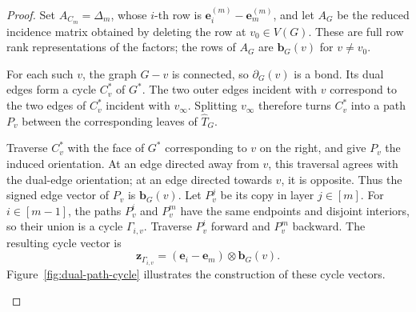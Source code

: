 \documentclass[10pt,a4paper]{amsart}
\numberwithin{equation}{section}
\theoremstyle{definition}
\theoremstyle{remark}
\begin{document}
\begin{proof}
Set \(A_{C_m}=\Delta_m\), whose \(i\)-th row is
\(\boldsymbol e_i^{(m)}-\boldsymbol e_m^{(m)}\), and let \(A_G\)
be the reduced incidence matrix obtained by deleting the row at
\(v_0\in V(G)\).  These are full row rank representations of the
factors; the rows of \(A_G\) are
\(\boldsymbol b_G(v)\) for \(v\ne v_0\).

For each such \(v\), the graph \(G-v\) is connected, so
\(\partial_G(v)\) is a bond.  Its dual edges form a cycle
\(C_v^*\) of \(G^*\).  The two outer edges incident with \(v\)
correspond to the two edges of \(C_v^*\) incident with
\(v_\infty\).  Splitting \(v_\infty\) therefore turns \(C_v^*\)
into a path \(P_v\) between the corresponding leaves of
\(\widehat T_G\).

Traverse \(C_v^*\) with the face of \(G^*\) corresponding to
\(v\) on the right, and give \(P_v\) the induced orientation.
At an edge directed away from \(v\), this traversal agrees with
the dual-edge orientation; at an edge directed towards \(v\),
it is opposite.  Thus the signed edge vector of \(P_v\) is
\(\boldsymbol b_G(v)\).  Let \(P_v^j\) be its copy in layer
\(j\in[m]\).  For \(i\in[m-1]\), the paths \(P_v^i\) and
\(P_v^m\) have the same endpoints and disjoint interiors, so
their union is a cycle \(\Gamma_{i,v}\).  Traverse \(P_v^i\)
forward and \(P_v^m\) backward.  The resulting cycle vector is
\[
 \boldsymbol{z}_{\Gamma_{i,v}}=(\boldsymbol{e}_i-\boldsymbol{e}_m) \otimes\boldsymbol b_G(v).
\]
Figure~\ref{fig:dual-path-cycle} illustrates the construction of these cycle vectors.
\begin{figure}[!ht]
\centering
{}
\end{figure}
\end{proof}
\end{document}
